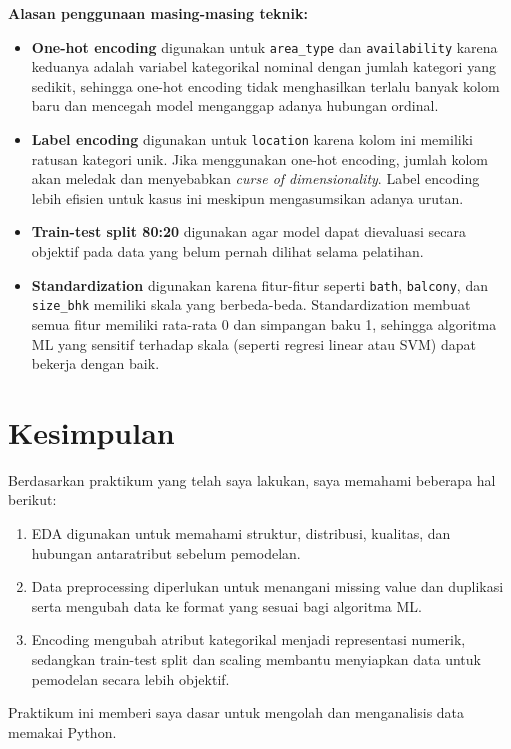 \documentclass[a4paper,oneside,12pt]{report}
\begin{document}
\textbf{Alasan penggunaan masing-masing teknik:}
\begin{itemize}
    \item \textbf{One-hot encoding} digunakan untuk \texttt{area\_type} dan \texttt{availability} karena keduanya adalah variabel kategorikal nominal dengan jumlah kategori yang sedikit, sehingga one-hot encoding tidak menghasilkan terlalu banyak kolom baru dan mencegah model menganggap adanya hubungan ordinal.
    \item \textbf{Label encoding} digunakan untuk \texttt{location} karena kolom ini memiliki ratusan kategori unik. Jika menggunakan one-hot encoding, jumlah kolom akan meledak dan menyebabkan \textit{curse of dimensionality}. Label encoding lebih efisien untuk kasus ini meskipun mengasumsikan adanya urutan.
    \item \textbf{Train-test split 80:20} digunakan agar model dapat dievaluasi secara objektif pada data yang belum pernah dilihat selama pelatihan.
    \item \textbf{Standardization} digunakan karena fitur-fitur seperti \texttt{bath}, \texttt{balcony}, dan \texttt{size\_bhk} memiliki skala yang berbeda-beda. Standardization membuat semua fitur memiliki rata-rata 0 dan simpangan baku 1, sehingga algoritma ML yang sensitif terhadap skala (seperti regresi linear atau SVM) dapat bekerja dengan baik.
\end{itemize}

\clearpage

\chapter{Kesimpulan}
Berdasarkan praktikum yang telah saya lakukan, saya memahami beberapa hal berikut:

\begin{enumerate}
    \item EDA digunakan untuk memahami struktur, distribusi, kualitas, dan hubungan antaratribut sebelum pemodelan.
    \item Data preprocessing diperlukan untuk menangani missing value dan duplikasi serta mengubah data ke format yang sesuai bagi algoritma ML.
    \item Encoding mengubah atribut kategorikal menjadi representasi numerik, sedangkan train-test split dan scaling membantu menyiapkan data untuk pemodelan secara lebih objektif.
\end{enumerate}

Praktikum ini memberi saya dasar untuk mengolah dan menganalisis data memakai Python.
\end{document}
